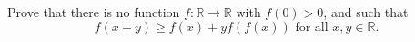 Prove that there is no function \(f\colon  \mathbb{R} \to \mathbb{R}\) with \(f(0) >0\), and such that
\[f(x+y) \geq f(x) +yf(f(x)) \text{ for all } x,y \in \mathbb{R}. \]